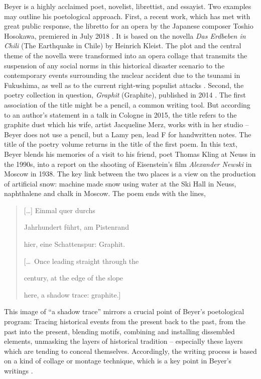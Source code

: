 \documentclass{article}
\begin{document}
Beyer is a highly acclaimed poet, novelist, librettist, and essayist.
Two examples may outline his poetological approach. First, a recent
work, which has met with great public response, the libretto for an
opera by the Japanese composer Toshio Hosokawa, premiered in July 2018
\citep{beyer_libretto_2018}. It is based on the novella \emph{Das Erdbeben in Chili} (The
Earthquake in Chile) by Heinrich Kleist. The plot and the central theme
of the novella were transformed into an opera collage that transmits the
suspension of any social norms in this historical disaster scenario to
the contemporary events surrounding the nuclear accident due to the
tsunami in Fukushima, as well as to the current right-wing populist
attacks \parencite{wix_programmheft_2018}. Second, the poetry collection in question, \emph{Graphit}
(Graphite), published in 2014 \citep{beyer_graphit_2014}. The first association of
the title might be a pencil, a common writing tool. But according to an
author's statement in a talk in Cologne in 2015, the title refers to the
graphite dust which his wife, artist Jacqueline Merz, works with in her
studio -- Beyer does not use a pencil, but a Lamy pen, lead F for
handwritten notes. The title of the poetry volume returns in the title
of the first poem. In this text, Beyer blends his memories of a visit to
his friend, poet Thomas Kling at Neuss in the 1990s, into a report on
the shooting of Eisenstein's film \emph{Alexander Newski} in Moscow in
1938. The key link between the two places is a view on the production of
artificial snow: machine made snow using water at the Ski Hall in
Neuss, naphthalene and chalk in Moscow. The poem ends with the lines,

\begin{quote}
{[}\ldots{]} Einmal quer durchs

Jahrhundert führt, am Pistenrand

hier, eine Schattenspur: Graphit. 

\vspace{1em}
 
{[}\ldots~Once leading straight through the

century, at the edge of the slope

here, a shadow trace: graphite.{]}

\begin{flushright}
    \parencite[17]{beyer_graphit_2014}
\end{flushright} 
\end{quote}

This image of ``a shadow trace'' mirrors a crucial point of Beyer's
poetological program: Tracing historical events from the present back to
the past, from the past into the present, blending motifs,
combining and installing dissembled elements, unmasking the layers of
historical tradition -- especially these layers which are tending to
conceal themselves. Accordingly, the writing process is based on a kind of collage or
montage technique, which is a key point in Beyer's writings \citep{wix_editionsphilologie_2017, wix_genese_2019}.
\end{document}
